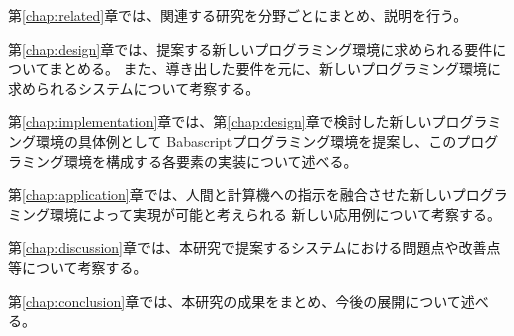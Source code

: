 第\ref{chap:related}章では、関連する研究を分野ごとにまとめ、説明を行う。

第\ref{chap:design}章では、提案する新しいプログラミング環境に求められる要件についてまとめる。
また、導き出した要件を元に、新しいプログラミング環境に求められるシステムについて考察する。

第\ref{chap:implementation}章では、第\ref{chap:design}章で検討した新しいプログラミング環境の具体例として
Babascriptプログラミング環境を提案し、このプログラミング環境を構成する各要素の実装について述べる。

第\ref{chap:application}章では、人間と計算機への指示を融合させた新しいプログラミング環境によって実現が可能と考えられる
新しい応用例について考察する。

第\ref{chap:discussion}章では、本研究で提案するシステムにおける問題点や改善点等について考察する。

第\ref{chap:conclusion}章では、本研究の成果をまとめ、今後の展開について述べる。
